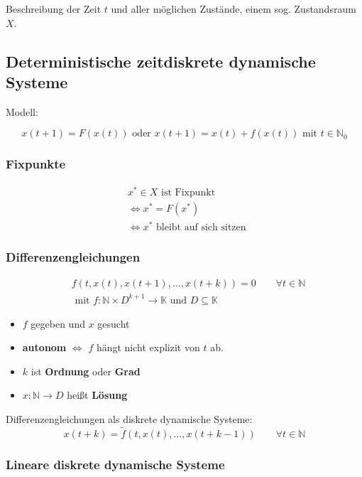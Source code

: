 \documentclass[a4paper]{article}
\newcommand{\N}{\mathbb{N}}
\begin{document}
Beschreibung der Zeit $t$ und aller möglichen Zustände, einem sog.
Zustandsraum $X$.

\subsection{Deterministische zeitdiskrete dynamische Systeme}

Modell:

\[
	x(t+1) = F(x(t)) \text{ oder } x(t+1) = x(t) + f(x(t))
	\text{ mit } t \in \N_0
\] 

\subsubsection{Fixpunkte}

\begin{align*}
	& x ^{*} \in X \text{ ist Fixpunkt } \\
	& \Leftrightarrow x ^{*} = F ( x ^{*} ) \\
	& \Leftrightarrow x ^{*} \text{ bleibt auf sich sitzen }
\end{align*}

\subsubsection{Differenzengleichungen}


\begin{align*}
	& f(t, x(t), x(t+1), ..., x(t+k)) = 0 \qquad
	\forall t \in \mathbb{N} \\
	& \text{ mit } f: \N \times D^{k+1} \rightarrow \mathbb{K}
	\text{ und } D \subseteq \mathbb{K}
\end{align*}

\begin{itemize}
	\item $f$ gegeben und $x$ gesucht
	\item \textbf{autonom} $\Leftrightarrow$ 
		$f$ hängt nicht explizit von $t$ ab.
	\item $k$ ist \textbf{Ordnung} oder \textbf{Grad} 
	\item $x: \N \rightarrow D$ heißt \textbf{Lösung}
\end{itemize}

Differenzengleichungen als diskrete dynamische Systeme:
\[
	x(t+k) = \tilde{f} \left(
		t, x(t), ..., x(t+k-1)
	\right) \qquad
	\forall t \in \mathbb{N} 
\] 

\subsubsection{Lineare diskrete dynamische Systeme}
\end{document}
